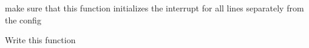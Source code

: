 
\begin{DoxyRefList}
\item[Global \mbox{\hyperlink{_e_x_t_i__program_8c_af54debc6d14edcd542b2d03f68b181b8}{MEXTI\+\_\+v\+Init}} (void)]\label{todo__todo000001}%
%
make sure that this function initializes the interrupt for all lines separately from the config  
\item[Global \mbox{\hyperlink{_e_x_t_i__interface_8h_a4855e79776f4d6ab5414c92a08a39c05}{MEXTI\+\_\+v\+Init\+\_\+\+With\+Struct}} (\mbox{\hyperlink{group__compiler_ga30c6e83ff2cac859ff6d852ea99fa3f1}{P2\+VAR(\+EXTI\+\_\+\+Config\+Type)}} A\+\_\+x\+Config)]\label{todo__todo000002}%
%
Write this function 
\end{DoxyRefList}